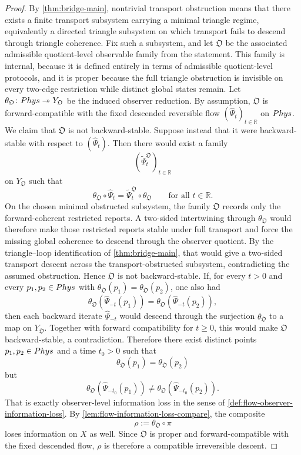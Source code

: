 \begin{proof}
	By \cref{thm:bridge-main}, nontrivial transport obstruction means that
	there exists a finite transport subsystem carrying a minimal triangle
	regime, equivalently a directed triangle subsystem on which transport
	fails to descend through triangle coherence. Fix such a subsystem, and
	let \(\mathfrak O\) be the associated admissible quotient-level
	observable family from the statement. This family is internal, because
	it is defined entirely in terms of admissible quotient-level protocols,
	and it is proper because the full triangle obstruction is invisible on
	every two-edge restriction while distinct global states remain.
	Let \(\theta_{\mathfrak O}\colon Phys\twoheadrightarrow Y_{\mathfrak O}\)
	be the induced observer reduction. By assumption, \(\mathfrak O\) is
	forward-compatible with the fixed descended reversible flow
	\((\widehat\Psi_t)_{t\in\mathbb R}\) on \(Phys\).
	We claim that \(\mathfrak O\) is not backward-stable. Suppose instead
	that it were backward-stable with respect to \((\widehat\Psi_t)\). Then
	there would exist a family
	\[
		(\widetilde\Psi_t^{\mathfrak O})_{t\in\mathbb R}
	\]
	on \(Y_{\mathfrak O}\) such that
	\[
		\theta_{\mathfrak O}\circ\widehat\Psi_t
		=
		\widetilde\Psi_t^{\mathfrak O}\circ\theta_{\mathfrak O}
		\qquad
		\text{for all }t\in\mathbb R.
	\]
	On the chosen minimal obstructed subsystem, the family \(\mathfrak O\)
	records only the forward-coherent restricted reports. A two-sided
	intertwining through \(\theta_{\mathfrak O}\) would therefore make those
	restricted reports stable under full transport and force the missing
	global coherence to descend through the observer quotient. By the
	triangle--loop identification of \cref{thm:bridge-main}, that would give
	a two-sided transport descent across the transport-obstructed subsystem,
	contradicting the assumed obstruction. Hence \(\mathfrak O\) is not
	backward-stable.
	If, for every \(t>0\) and every \(p_1,p_2\in Phys\) with
	\(\theta_{\mathfrak O}(p_1)=\theta_{\mathfrak O}(p_2)\), one also had
	\[
		\theta_{\mathfrak O}(\widehat\Psi_{-t}(p_1))
		=
		\theta_{\mathfrak O}(\widehat\Psi_{-t}(p_2)),
	\]
	then each backward iterate \(\widehat\Psi_{-t}\) would descend through
	the surjection \(\theta_{\mathfrak O}\) to a map on \(Y_{\mathfrak O}\).
	Together with forward compatibility for \(t\ge0\), this would make
	\(\mathfrak O\) backward-stable, a contradiction. Therefore there exist
	distinct points \(p_1,p_2\in Phys\) and a time \(t_0>0\) such that
	\[
		\theta_{\mathfrak O}(p_1)=\theta_{\mathfrak O}(p_2)
	\]
	but
	\[
		\theta_{\mathfrak O}(\widehat\Psi_{-t_0}(p_1))
		\neq
		\theta_{\mathfrak O}(\widehat\Psi_{-t_0}(p_2)).
	\]
	That is exactly observer-level information loss in the sense of
	\cref{def:flow-observer-information-loss}. By
	\cref{lem:flow-information-loss-compare}, the composite
	\[
		\rho:=\theta_{\mathfrak O}\circ\pi
	\]
	loses information on \(X\) as well. Since \(\mathfrak O\) is proper and
	forward-compatible with the fixed descended flow, \(\rho\) is therefore
	a compatible irreversible descent.
\end{proof}
